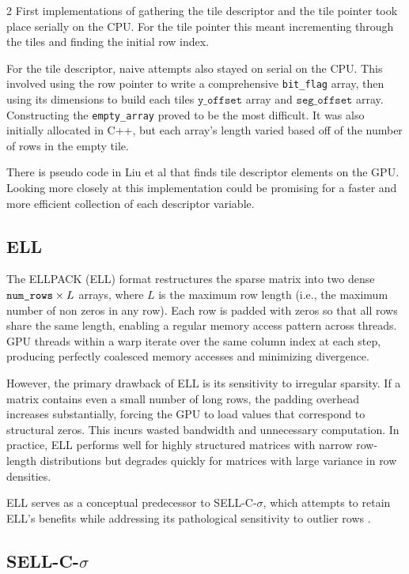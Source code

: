 \documentclass{article}
\begin{document}
\begin{multicols}{2}
First implementations of gathering the tile descriptor and the tile pointer took place serially on the CPU. For the tile pointer this meant incrementing through the tiles and finding the initial row index.

For the tile descriptor, naive attempts also stayed on serial on the CPU. This involved using the row pointer to write a comprehensive \texttt{bit\_flag} array, then using its dimensions to build each tiles $\texttt{y\_offset}$ array and $\texttt{seg\_offset}$ array. Constructing the \texttt{empty\_array} proved to be the most difficult. It was also initially allocated in C++, but each array's length varied based off of the number of rows in the empty tile. 

There is pseudo code in Liu et al \cite{Liu2015CSR5} that finds tile descriptor elements on the GPU. Looking more closely at this implementation could be promising for a faster and more efficient collection of each descriptor variable.  


\subsection{ELL}

The ELLPACK (ELL) format restructures the sparse matrix into two dense 
$\text{\texttt{num\_rows}} \times L$ arrays, where $L$ is the maximum row length 
(i.e., the maximum number of non zeros in any row). Each row is padded with 
zeros so that all rows share the same length, enabling a regular memory access 
pattern across threads. GPU threads within a warp iterate over the same column 
index at each step, producing perfectly coalesced memory accesses and minimizing 
divergence.

However, the primary drawback of ELL is its sensitivity to irregular sparsity. 
If a matrix contains even a small number of long rows, the padding overhead 
increases substantially, forcing the GPU to load values that correspond to 
structural zeros. This incurs wasted bandwidth and unnecessary computation. In 
practice, ELL performs well for highly structured matrices with narrow row-length 
distributions but degrades quickly for matrices with large variance in row densities.

ELL serves as a conceptual predecessor to SELL-C-$\sigma$, which attempts to 
retain ELL’s benefits while addressing its pathological sensitivity to outlier 
rows \cite{SELLCSIGMA}.

\subsection{SELL-C-$\sigma$}


\end{multicols}
\end{document}
